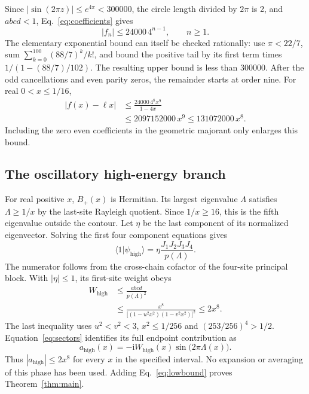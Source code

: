 \documentclass[11pt,a4paper]{article}
\newcommand{\ii}{\mathrm{i}}
\newcommand{\bra}[1]{\langle #1\rvert}
\numberwithin{equation}{section}
\begin{document}
Since $|\sin(2\pi z)|\le e^{4\pi}<300000$, the circle length divided
by $2\pi$ is 2, and $abcd<1$, Eq.~\eqref{eq:coefficients} gives
\begin{equation}
 |f_n|\le 24000\,4^{n-1},\qquad n\ge1.
 \label{eq:coefficientbound}
\end{equation}
The elementary exponential bound can itself be checked rationally: use
$\pi<22/7$, sum $\sum_{k=0}^{100}(88/7)^k/k!$, and bound the
positive tail by its first term times $1/(1-(88/7)/102)$.
The resulting upper bound is less than 300000.
After the odd cancellations and even parity zeros, the remainder starts
at order nine. For real $0<x\le1/16$,
\begin{align}
 |f(x)-\ell x|
 &\le\frac{24000\,4^8x^9}{1-4x}\nonumber\\
 &\le2097152000\,x^9
 \le131072000\,x^8.
 \label{eq:lowbound}
\end{align}
Including the zero even coefficients in the geometric majorant only
enlarges this bound.

\subsection{The oscillatory high-energy branch}
For real positive $x$, $B_+(x)$ is Hermitian. Its largest eigenvalue
$\Lambda$ satisfies $\Lambda\ge1/x$ by the last-site Rayleigh quotient.
Since $1/x\ge16$, this is the fifth eigenvalue outside the contour.
Let $\eta$ be the last component of its normalized eigenvector.
Solving the first four component equations gives
\begin{equation}
 \bra{1}\psi_{\mathrm{high}}\rangle
 =\eta\frac{J_1J_2J_3J_4}{p(\Lambda)}.
 \label{eq:highcomponent}
\end{equation}
The numerator follows from the cross-chain cofactor of the four-site
principal block. With $|\eta|\le1$, its first-site weight obeys
\begin{align}
 W_{\mathrm{high}}
 &\le\frac{abcd}{p(\Lambda)^2}\nonumber\\
 &\le\frac{x^8}{\bigl[(1-u^2x^2)(1-v^2x^2)\bigr]^2}
 \le2x^8.
 \label{eq:highbound}
\end{align}
The last inequality uses $u^2<v^2<3$, $x^2\le1/256$ and
$(253/256)^4>1/2$.
Equation~\eqref{eq:sectors} identifies its full endpoint contribution as
\begin{equation}
 a_{\mathrm{high}}(x)=-\ii W_{\mathrm{high}}(x)
                      \sin\bigl(2\pi\Lambda(x)\bigr).
\end{equation}
Thus $|a_{\mathrm{high}}|\le2x^8$ for every $x$ in the specified
interval. No expansion or averaging of this phase has been used.
Adding Eq.~\eqref{eq:lowbound} proves Theorem~\ref{thm:main}.
\end{document}
